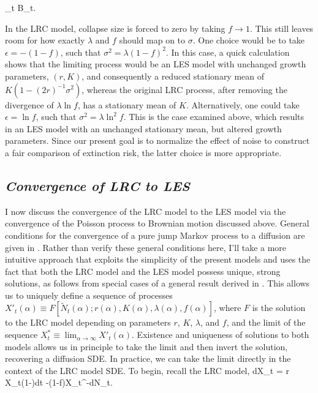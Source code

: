 \be
\epsilon {}_t   \sqrt{\lambda}\epsilon B_t.
\ee

In the LRC model, collapse size is forced to zero by taking $f\to 1$.  This still leaves room for how exactly $\lambda$ and $f$ should map on to $\sigma$.  One choice would be to take $\epsilon = -(1-f)$, such that $\sigma^2 = \lambda (1-f)^2$.  In this case, a quick calculation shows that the limiting process would be an LES model with unchanged growth parameters, $(r,K)$, and consequently a reduced stationary mean of $K(1-(2r)^{-1}\sigma^2)$, whereas the original LRC process, after removing the divergence of $\lambda\ln f$, has a stationary mean of $K$.  Alternatively, one could take  $\epsilon = \ln f$, such that $\sigma^2 = \lambda \ln^2f$.  This is the case examined above, which results in an LES model with an unchanged stationary mean, but altered growth parameters.  Since our present goal is to normalize the effect of noise to construct a fair comparison of extinction risk, the latter choice is more appropriate.


\subsection*{\textit{Convergence of LRC to LES}}

I now discuss the convergence of the LRC model to the LES model via the convergence of the Poisson process to Brownian motion discussed above.  General conditions for the convergence of a pure jump Markov process to a diffusion are given in \cite{jacod2013limit}.  Rather than verify these general conditions here, I'll take a more intuitive approach that exploits the simplicity of the present models and uses the fact that both the LRC model and the LES model possess unique, strong solutions, as follows from special cases of a general result derived in \cite{bao2011competitive}.  This allows us to uniquely define a sequence of processes $X'_t(\alpha) \equiv F[\tilde{N}_t(\alpha); r(\alpha),K(\alpha),\lambda(\alpha),f(\alpha)]$, where $F$ is the solution to the LRC model depending on parameters $r$, $K$, $\lambda$, and $f$, and the limit of the sequence $X^*_t \equiv \lim_{\alpha\to\infty} X'_t(\alpha)$.   Existence and uniqueness of solutions to both models allows us in principle to take the limit and then invert the solution, recovering a diffusion SDE.  In practice, we can take the limit directly in the context of the LRC model SDE.  
To begin, recall the LRC model,
\be
dX_t = r X_t\left(1-\right)dt -(1-f)X_{t^-}dN_t.
\ee

